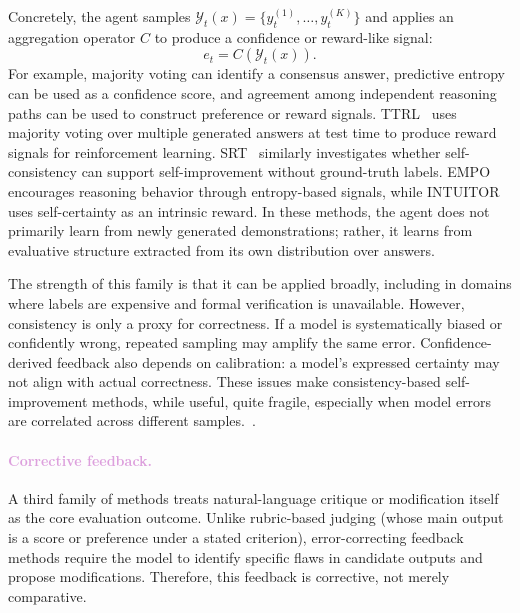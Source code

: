 Concretely, the agent samples $\mathcal{Y}_t(x)=\{y_t^{(1)},\ldots,y_t^{(K)}\}$ and applies an aggregation operator $C$ to produce a confidence or reward-like signal:
\begin{equation}
e_t=C(\mathcal{Y}_t(x)).
\end{equation}
For example, majority voting can identify a consensus answer, predictive entropy can be used as a confidence score, and agreement among independent reasoning paths can be used to construct preference or reward signals. TTRL~\citep{zuo2025ttrl} uses majority voting over multiple generated answers at test time to produce reward signals for reinforcement learning. SRT~\citep{shafayat2025can} similarly investigates whether self-consistency can support self-improvement without ground-truth labels. EMPO~\citep{zhang2025right} encourages reasoning behavior through entropy-based signals, while INTUITOR~\citep{zhao2025learning} uses self-certainty as an intrinsic reward. In these methods, the agent does not primarily learn from newly generated demonstrations; rather, it learns from evaluative structure extracted from its own distribution over answers.

The strength of this family is that it can be applied broadly, including in domains where labels are expensive and formal verification is unavailable. However, consistency is only a proxy for correctness. If a model is systematically biased or confidently wrong, repeated sampling may amplify the same error. Confidence-derived feedback also depends on calibration: a model's expressed certainty may not align with actual correctness. These issues make consistency-based self-improvement methods, while useful, quite fragile, especially when model errors are correlated across different samples.~\citep{tan-etal-2025-consistent, feng2025rethinkingllmuncertaintymultiagent, till2025teamingllmsdetectmitigate, anonymous2025complementing}.

\paragraph{\textcolor{Plum}{Corrective feedback.}}
A third family of methods treats natural-language critique or modification itself as the core evaluation outcome. Unlike rubric-based judging (whose main output is a score or preference under a stated criterion), error-correcting feedback methods require the model to identify specific flaws in candidate outputs and propose modifications. Therefore, this feedback is corrective, not merely comparative.

